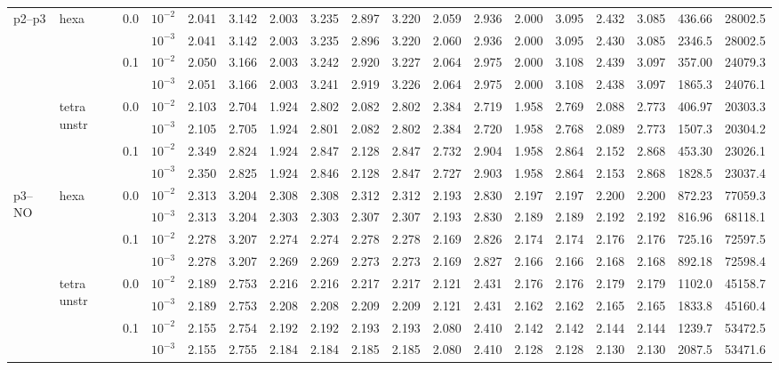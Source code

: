 \begin{longtable}{llclrrrrrrrrrrrrrr}
\multirow{8}{*}{p2--p3} & \multirow{4}{*}{hexa} & \multirow{2}{*}{0.0} & $10^{-2}$ & 2.041 & 3.142 & 2.003 & 3.235 & 2.897 & 3.220 & 2.059 & 2.936 & 2.000 & 3.095 & 2.432 & 3.085 & 436.66 & 28002.5 \\
& & & $10^{-3}$ & 2.041 & 3.142 & 2.003 & 3.235 & 2.896 & 3.220 & 2.060 & 2.936 & 2.000 & 3.095 & 2.430 & 3.085 & 2346.5 & 28002.5 \\\cline{3-18}
& & \multirow{2}{*}{0.1} & $10^{-2}$ & 2.050 & 3.166 & 2.003 & 3.242 & 2.920 & 3.227 & 2.064 & 2.975 & 2.000 & 3.108 & 2.439 & 3.097 & 357.00 & 24079.3 \\
& & & $10^{-3}$ & 2.051 & 3.166 & 2.003 & 3.241 & 2.919 & 3.226 & 2.064 & 2.975 & 2.000 & 3.108 & 2.438 & 3.097 & 1865.3 & 24076.1 \\\cline{2-18}
& \multirow{4}{*}{tetra unstr} & \multirow{2}{*}{0.0} & $10^{-2}$ & 2.103 & 2.704 & 1.924 & 2.802 & 2.082 & 2.802 & 2.384 & 2.719 & 1.958 & 2.769 & 2.088 & 2.773 & 406.97 & 20303.3 \\
& & & $10^{-3}$ & 2.105 & 2.705 & 1.924 & 2.801 & 2.082 & 2.802 & 2.384 & 2.720 & 1.958 & 2.768 & 2.089 & 2.773 & 1507.3 & 20304.2 \\\cline{3-18}
& & \multirow{2}{*}{0.1} & $10^{-2}$ & 2.349 & 2.824 & 1.924 & 2.847 & 2.128 & 2.847 & 2.732 & 2.904 & 1.958 & 2.864 & 2.152 & 2.868 & 453.30 & 23026.1 \\
& & & $10^{-3}$ & 2.350 & 2.825 & 1.924 & 2.846 & 2.128 & 2.847 & 2.727 & 2.903 & 1.958 & 2.864 & 2.153 & 2.868 & 1828.5 & 23037.4 \\\hline

\multirow{8}{*}{p3--NO} & \multirow{4}{*}{hexa} & \multirow{2}{*}{0.0} & $10^{-2}$ & 2.313 & 3.204 & 2.308 & 2.308 & 2.312 & 2.312 & 2.193 & 2.830 & 2.197 & 2.197 & 2.200 & 2.200 & 872.23 & 77059.3 \\
& & & $10^{-3}$ & 2.313 & 3.204 & 2.303 & 2.303 & 2.307 & 2.307 & 2.193 & 2.830 & 2.189 & 2.189 & 2.192 & 2.192 & 816.96 & 68118.1 \\\cline{3-18}
& & \multirow{2}{*}{0.1} & $10^{-2}$ & 2.278 & 3.207 & 2.274 & 2.274 & 2.278 & 2.278 & 2.169 & 2.826 & 2.174 & 2.174 & 2.176 & 2.176 & 725.16 & 72597.5 \\
& & & $10^{-3}$ & 2.278 & 3.207 & 2.269 & 2.269 & 2.273 & 2.273 & 2.169 & 2.827 & 2.166 & 2.166 & 2.168 & 2.168 & 892.18 & 72598.4 \\\cline{2-18}
& \multirow{4}{*}{tetra unstr} & \multirow{2}{*}{0.0} & $10^{-2}$ & 2.189 & 2.753 & 2.216 & 2.216 & 2.217 & 2.217 & 2.121 & 2.431 & 2.176 & 2.176 & 2.179 & 2.179 & 1102.0 & 45158.7 \\
& & & $10^{-3}$ & 2.189 & 2.753 & 2.208 & 2.208 & 2.209 & 2.209 & 2.121 & 2.431 & 2.162 & 2.162 & 2.165 & 2.165 & 1833.8 & 45160.4 \\\cline{3-18}
& & \multirow{2}{*}{0.1} & $10^{-2}$ & 2.155 & 2.754 & 2.192 & 2.192 & 2.193 & 2.193 & 2.080 & 2.410 & 2.142 & 2.142 & 2.144 & 2.144 & 1239.7 & 53472.5 \\
& & & $10^{-3}$ & 2.155 & 2.755 & 2.184 & 2.184 & 2.185 & 2.185 & 2.080 & 2.410 & 2.128 & 2.128 & 2.130 & 2.130 & 2087.5 & 53471.6 \\\hline


\end{longtable}
